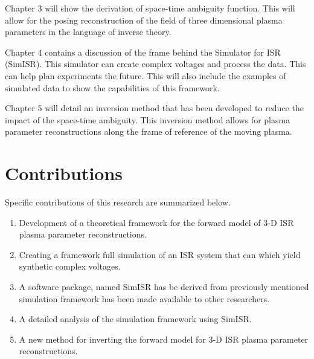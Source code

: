 Chapter 3 will show the derivation of space-time ambiguity function. This will allow for the posing reconstruction of the field of three dimensional plasma parameters in the language of inverse theory. 

Chapter 4 contains a discussion of the frame behind the Simulator for ISR (SimISR). This simulator can create complex voltages and process the data. This can help plan experiments the future. This will also include the examples of simulated data to show the capabilities of this framework.

Chapter 5 will detail an inversion method that has been developed to reduce the impact of the space-time ambiguity. This inversion method allows for plasma parameter reconstructions along the frame of reference of the moving plasma.

\section{Contributions}
Specific contributions of this research are summarized below.

\begin{enumerate}
\item Development of a theoretical framework for the forward model of 3-D ISR plasma parameter reconstructions.
\item Creating a framework full simulation of an ISR system that can which yield synthetic complex voltages.
\item A software package, named SimISR has be derived from previously mentioned simulation framework has been made available to other researchers.
\item A detailed analysis of the simulation framework using SimISR.
\item A new method for inverting the forward model for 3-D ISR plasma parameter reconstructions.
\end{enumerate}